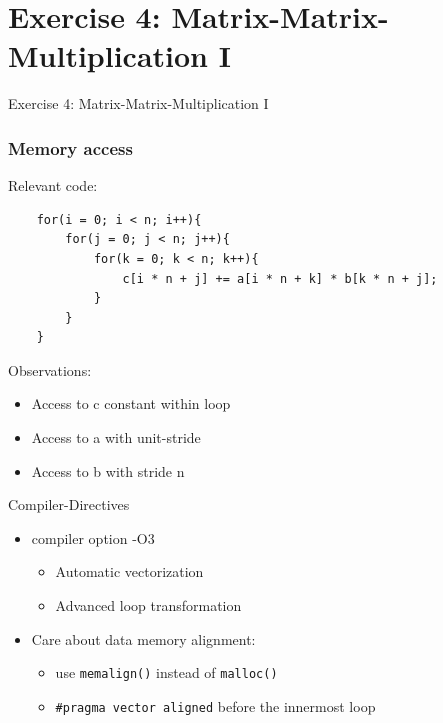 \section{Exercise 4: Matrix-Matrix-Multiplication I}

\begin{frame}{}
\begin{center}
{\Huge Exercise 4: Matrix-Matrix-Multiplication I}
\end{center}
\end{frame}

\begin{frame}[fragile]
\frametitle{Memory access}
Relevant code:
\codestylec
\begin{lstlisting}
    for(i = 0; i < n; i++){
        for(j = 0; j < n; j++){
            for(k = 0; k < n; k++){
                c[i * n + j] += a[i * n + k] * b[k * n + j];
            }
        }
    }
\end{lstlisting}
Observations:
\begin{itemize}
\item Access to c constant within loop
\item Access to a with unit-stride
\item Access to b with stride n
\end{itemize}

\end{frame}

\begin{frame}{Compiler-Directives}
\begin{itemize}
\item compiler option -O3
	\begin{itemize}
	\item Automatic vectorization
	\item Advanced loop transformation 
	\end{itemize}
\item Care about data memory alignment:
	\begin{itemize}
	\item use \texttt{memalign()} instead of \texttt{malloc()}
	\item \texttt{\#pragma vector aligned} before the innermost loop
	\end{itemize}
\end{itemize}
\end{frame}

